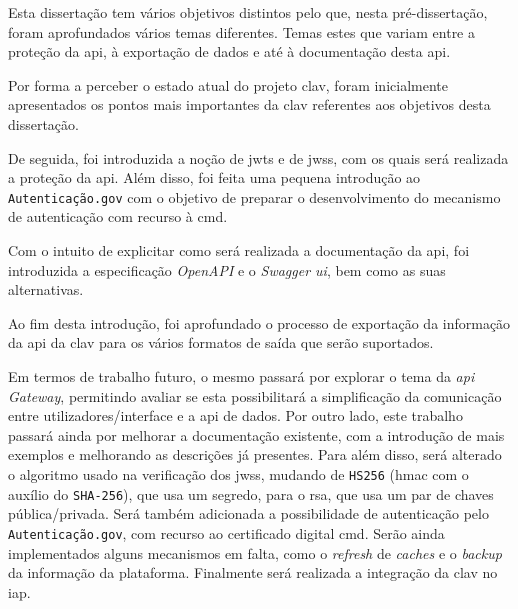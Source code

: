 
Esta dissertação tem vários objetivos distintos pelo que, nesta pré-dissertação, foram aprofundados vários temas diferentes. Temas estes que variam entre a proteção da \acrshort{api}, à exportação de dados e até à documentação desta \acrshort{api}.

Por forma a perceber o estado atual do projeto \acrshort{clav}, foram inicialmente apresentados os pontos mais importantes da \acrshort{clav} referentes aos objetivos desta dissertação.

De seguida, foi introduzida a noção de \acrshort{jwt}s e de \acrshort{jws}s, com os quais será realizada a proteção da \acrshort{api}. Além disso, foi feita uma pequena introdução ao \texttt{Autenticação.gov} com o objetivo de preparar o desenvolvimento do mecanismo de autenticação com recurso à \acrlong{cmd}.

Com o intuito de explicitar como será realizada a documentação da \acrshort{api}, foi introduzida a especificação \textit{OpenAPI} e o \textit{Swagger \acrshort{ui}}, bem como as suas alternativas.

Ao fim desta introdução, foi aprofundado o processo de exportação da informação da \acrshort{api} da \acrshort{clav} para os vários formatos de saída que serão suportados.

Em termos de trabalho futuro, o mesmo passará por explorar o tema da \textit{\acrshort{api} Gateway}, permitindo avaliar se esta possibilitará a simplificação da comunicação entre utilizadores/interface e a \acrshort{api} de dados. Por outro lado, este trabalho passará ainda por melhorar a documentação existente, com a introdução de mais exemplos e melhorando as descrições já presentes. Para além disso, será alterado o algoritmo usado na verificação dos \acrshort{jws}s, mudando de \texttt{HS256} (\acrshort{hmac} com o auxílio do \texttt{SHA-256}), que usa um segredo, para o \acrshort{rsa}, que usa um par de chaves pública/privada. Será também adicionada a possibilidade de autenticação pelo \texttt{Autenticação.gov}, com recurso ao certificado digital \acrlong{cmd}. Serão ainda implementados alguns mecanismos em falta, como o \textit{refresh} de \textit{caches} e o \textit{backup} da informação da plataforma. Finalmente será realizada a integração da \acrshort{clav} no \acrshort{iap}.
